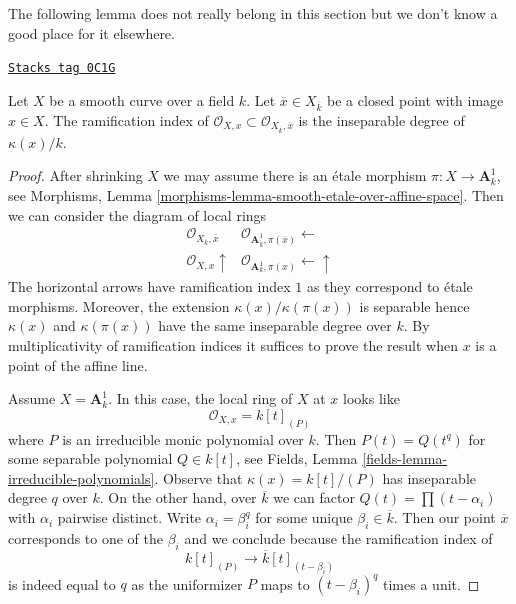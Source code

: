 The following lemma does not really belong in this section
but we don't know a good place for it elsewhere.

\begin{lemma}
\label{curves-lemma-ramification-to-algebraic-closure}
\href{https://stacks.math.columbia.edu/tag/0C1G}{\texttt{Stacks tag 0C1G}}

Let $X$ be a smooth curve over a field $k$. Let
$\overline{x} \in X_{\overline{k}}$ be a closed
point with image $x \in X$. The ramification index of
$\mathcal{O}_{X, x} \subset \mathcal{O}_{X_{\overline{k}}, \overline{x}}$
is the inseparable degree of $\kappa(x)/k$.
\end{lemma}

\begin{proof}
After shrinking $X$ we may assume there is an \'etale morphism
$\pi : X \to \mathbf{A}^1_k$, see
Morphisms, Lemma \ref{morphisms-lemma-smooth-etale-over-affine-space}.
Then we can consider the diagram of local rings
$$
\begin{array}{cc}\mathcal{O}_{X_{\overline{k}}, \overline{x}} & \mathcal{O}_{\mathbf{A}^1_{\overline{k}}, \pi(\overline{x})} \longleftarrow \\ \mathcal{O}_{X, x} \uparrow & \mathcal{O}_{\mathbf{A}^1_k, \pi(x)} \longleftarrow\uparrow\end{array}
$$
The horizontal arrows have ramification index $1$ as they correspond to
\'etale morphisms. Moreover, the extension $\kappa(x)/\kappa(\pi(x))$ is
separable hence $\kappa(x)$ and $\kappa(\pi(x))$ have the same
inseparable degree over $k$.
By multiplicativity of ramification indices it suffices to
prove the result when $x$ is a point of the affine line.

\medskip\noindent
Assume $X = \mathbf{A}^1_k$. In this case, the local ring of $X$ at $x$
looks like
$$
\mathcal{O}_{X, x} = k[t]_{(P)}
$$
where $P$ is an irreducible monic polynomial over $k$.
Then $P(t) = Q(t^q)$ for some separable polynomial $Q \in k[t]$, see
Fields, Lemma \ref{fields-lemma-irreducible-polynomials}.
Observe that $\kappa(x) = k[t]/(P)$ has inseparable degree $q$
over $k$. On the other hand, over $\overline{k}$ we can factor
$Q(t) = \prod (t - \alpha_i)$ with $\alpha_i$ pairwise distinct.
Write $\alpha_i = \beta_i^q$ for some unique $\beta_i \in \overline{k}$.
Then our point $\overline{x}$ corresponds to one of the $\beta_i$
and we conclude because the ramification index of
$$
k[t]_{(P)} \longrightarrow \overline{k}[t]_{(t - \beta_i)}
$$
is indeed equal to $q$ as the uniformizer $P$ maps to
$(t - \beta_i)^q$ times a unit.
\end{proof}

